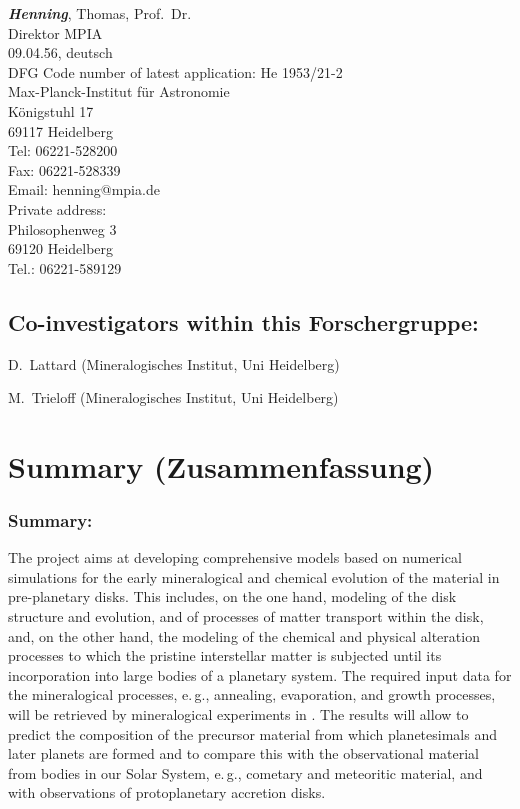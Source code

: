 {\bfseries\itshape Henning}, Thomas, Prof.~Dr.\\
Direktor MPIA\\
09.04.56, deutsch\\
DFG Code number of latest application: He 1953/21-2\\
Max-Planck-Institut f\"ur Astronomie\\
K\"onigstuhl 17\\
69117 Heidelberg\\
Tel: 06221-528200\\
Fax: 06221-528339\\
Email: henning@mpia.de\\
Private address:\\
Philosophenweg 3\\
69120 Heidelberg\\
Tel.: 06221-589129\\

\subsection{Co-investigators within this Forschergruppe:}
\begin{coilist}
\item D.~Lattard (Mineralogisches Institut, Uni Heidelberg)
\item M.~Trieloff (Mineralogisches Institut, Uni Heidelberg)
\end{coilist}


\section{Summary (Zusammenfassung)}
\subsubsection{Summary:}
The project aims at developing comprehensive models based on
numerical simulations for the early mineralogical and chemical
evolution of the material in pre-planetary disks. This includes,
on the one hand, modeling of the disk structure and evolution, and
of processes of matter transport within the disk, and, on the
other hand, the modeling of the chemical and physical alteration
processes to which the pristine interstellar matter is subjected
until its incorporation into large bodies of a planetary system.
The required input data for the mineralogical processes, e.\,g.,
annealing, evaporation, and growth processes, will be retrieved by
mineralogical experiments in \projlattard. The results will allow
to predict the composition of the precursor material from which
planetesimals and later planets are formed and to compare this
with the observational material from bodies in our Solar System,
e.\,g., cometary and meteoritic material, and with observations of
protoplanetary accretion disks.

